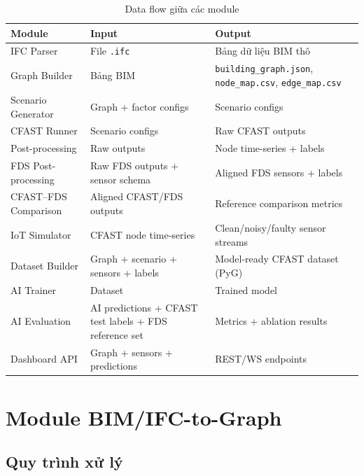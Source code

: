 \begin{table}[htbp]
\centering
\caption{Data flow giữa các module}
\label{tab:dataflow}
\footnotesize
\begin{tabularx}{\textwidth}{
  >{\raggedright\arraybackslash}p{}
  >{\raggedright\arraybackslash}p{}
  >{\raggedright\arraybackslash}X}
\toprule
\textbf{Module} & \textbf{Input} & \textbf{Output} \\
\midrule
IFC Parser        & File \texttt{.ifc}       & Bảng dữ liệu BIM thô \\
Graph Builder     & Bảng BIM                  & \texttt{building\_graph.json}, \texttt{node\_map.csv}, \texttt{edge\_map.csv} \\
Scenario Generator & Graph + factor configs   & Scenario configs \\
CFAST Runner      & Scenario configs           & Raw CFAST outputs \\
Post-processing   & Raw outputs                & Node time-series + labels \\
FDS Post-processing & Raw FDS outputs + sensor schema & Aligned FDS sensors + labels \\
CFAST--FDS Comparison & Aligned CFAST/FDS outputs & Reference comparison metrics \\
IoT Simulator     & CFAST node time-series     & Clean/noisy/faulty sensor streams \\
Dataset Builder   & Graph + scenario + sensors + labels & Model-ready CFAST dataset (PyG) \\
AI Trainer        & Dataset                    & Trained model \\
AI Evaluation     & AI predictions + CFAST test labels + FDS reference set & Metrics + ablation results \\
Dashboard API     & Graph + sensors + predictions & REST/WS endpoints \\
\bottomrule
\end{tabularx}
\end{table}

\section{Module BIM/IFC-to-Graph}
\label{sec:bimtograph}

\subsection{Quy trình xử lý}

